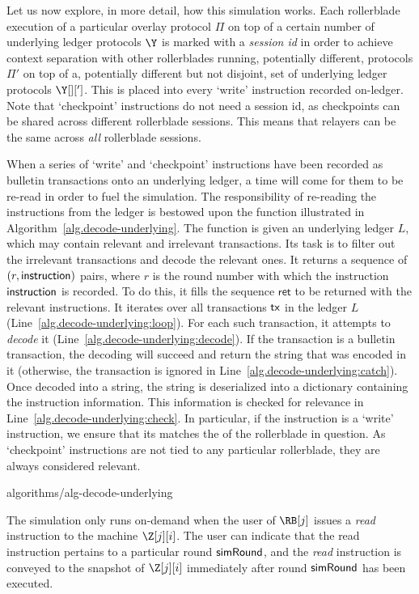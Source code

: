 Let us now explore, in more detail, how this simulation works. Each rollerblade execution
of a particular overlay protocol $\Pi$ on top of a certain number of underlying ledger
protocols $\Y$ is marked with a \emph{session id} \sid in order to achieve context
separation with other rollerblades running, potentially different, protocols $\Pi'$
on top of a, potentially different but not disjoint, set of underlying ledger protocols
$\Y[][']$. This \sid is placed into every `write' instruction recorded on-ledger.
Note that `checkpoint' instructions do not need a session id, as checkpoints can be
shared across different rollerblade sessions. This means that relayers can be the
same across \emph{all} rollerblade sessions.

When a series of `write' and `checkpoint' instructions have been recorded as bulletin
transactions onto an underlying ledger, a time will come for them to be re-read in order to fuel
the simulation. The responsibility of re-reading the instructions from the ledger is
bestowed upon the function \decodeUnderlying illustrated in
Algorithm~\ref{alg.decode-underlying}. The function is given an underlying ledger $L$,
which may contain relevant and irrelevant transactions.
Its task is to filter out the irrelevant transactions and decode the relevant ones.
It returns a sequence of $(r, \textsf{instruction})$ pairs, where $r$ is the round number
with which the instruction $\textsf{instruction}$ is recorded.
To do this, it fills the sequence $\textsf{ret}$ to be returned with the
relevant instructions. It iterates over all transactions $\textsf{tx}$ in the ledger $L$
(Line~\ref{alg.decode-underlying:loop}). For each such transaction, it attempts
to \emph{decode} it (Line~\ref{alg.decode-underlying:decode}). If the transaction
is a bulletin transaction, the decoding will succeed and return the string that
was encoded in it (otherwise, the transaction is ignored in
Line~\ref{alg.decode-underlying:catch}). Once decoded into a string, the string
is deserialized into a dictionary containing the instruction information. This
information is checked for relevance in Line~\ref{alg.decode-underlying:check}.
In particular, if the instruction is a `write' instruction, we ensure that its
\sid matches the \sid of the rollerblade in question. As `checkpoint' instructions
are not tied to any particular rollerblade, they are always considered relevant.

{algorithms/alg-decode-underlying}

The simulation only runs
on-demand when the user of $\RB[j]$ issues a \emph{read} instruction to the machine
$\Z[j][i]$. The user can indicate that the read instruction pertains to a particular
round $\textsf{simRound}$, and the \emph{read} instruction is conveyed to the snapshot
of $\Z[j][i]$ immediately after round $\textsf{simRound}$ has been executed.

